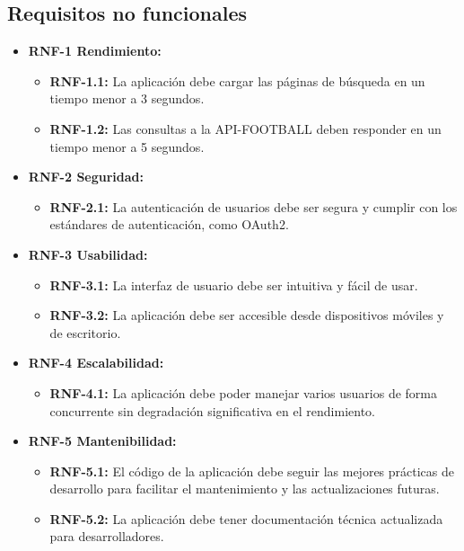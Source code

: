 \subsection{Requisitos no funcionales}
\begin{itemize}[label=\textbullet]
    \item \textbf{RNF-1 Rendimiento:}
    \begin{itemize}[label=--]
        \item \textbf{RNF-1.1:} La aplicación debe cargar las páginas de búsqueda en un tiempo menor a 3 segundos.
        \item \textbf{RNF-1.2:} Las consultas a la API-FOOTBALL deben responder en un tiempo menor a 5 segundos.
    \end{itemize}
    \item \textbf{RNF-2 Seguridad:}
    \begin{itemize}[label=--]
        \item \textbf{RNF-2.1:} La autenticación de usuarios debe ser segura y cumplir con los estándares de autenticación, como OAuth2.
    \end{itemize}
    \item \textbf{RNF-3 Usabilidad:}
    \begin{itemize}[label=--]
        \item \textbf{RNF-3.1:} La interfaz de usuario debe ser intuitiva y fácil de usar.
        \item \textbf{RNF-3.2:} La aplicación debe ser accesible desde dispositivos móviles y de escritorio.
    \end{itemize}
    \item \textbf{RNF-4 Escalabilidad:}
    \begin{itemize}[label=--]
        \item \textbf{RNF-4.1:} La aplicación debe poder manejar varios usuarios de forma concurrente sin degradación significativa en el rendimiento.
    \end{itemize}
    \item \textbf{RNF-5 Mantenibilidad:}
    \begin{itemize}[label=--]
        \item \textbf{RNF-5.1:} El código de la aplicación debe seguir las mejores prácticas de desarrollo para facilitar el mantenimiento y las actualizaciones futuras.
        \item \textbf{RNF-5.2:} La aplicación debe tener documentación técnica actualizada para desarrolladores.
    \end{itemize}

\end{itemize}
